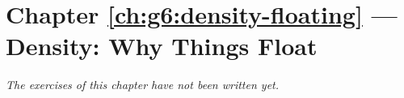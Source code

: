 \section*{Chapter \ref{ch:g6:density-floating} --- Density: Why Things Float}


\emph{The exercises of this chapter have not been written yet.}
